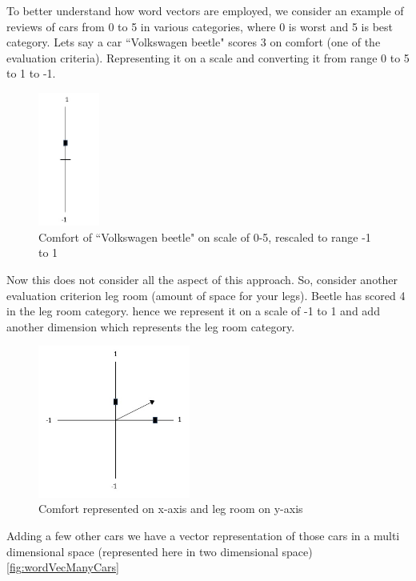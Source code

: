 To better understand how word vectors are employed, we consider an example of reviews of cars from 0 to 5 in various categories, where 0 is worst and 5 is best category. Lets say a car ``Volkswagen beetle" scores 3 on comfort (one of the evaluation criteria). Representing it on a scale and converting it from range 0 to 5 to 1 to -1.

\begin{figure}[!ht]
    \centering
    \includegraphics[width=2cm]{pics/wordVec.jpg}
    \captionsetup{justification=centering,margin=2cm}
    \caption{Comfort of ``Volkswagen beetle" on scale of 0-5, rescaled to range -1 to 1}
    \label{fig:volkswagan_example}
\end{figure}

Now this does not consider all the aspect of this approach. So, consider another evaluation criterion leg room (amount of space for your legs). Beetle has scored 4 in the leg room category. hence we represent it on a scale of -1 to 1 and add another dimension which represents the leg room category. 

\begin{figure}
    \centering
    \includegraphics[width=5cm]{pics/wordVec_2.jpg}
    \captionsetup{justification=centering,margin=2cm}
    \caption{Comfort represented on x-axis and leg room on y-axis}
    \label{fig:volkswagan_example_2}
\end{figure}

Adding a few other cars we have a vector representation of those cars in a multi dimensional space (represented here in two dimensional space) \ref{fig:wordVecManyCars}


